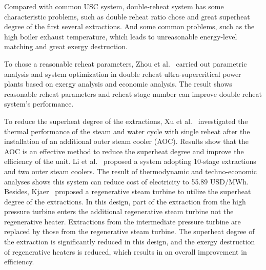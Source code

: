 \documentclass[preprint,12pt]{elsarticle}
\begin{document}
Compared with common USC system, double-reheat system has some characteristic problems, such as double reheat ratio chose and great superheat degree of the first several extractions.
And some common problems, such as the high boiler exhaust temperature, which leads to unreasonable energy-level matching and great exergy destruction. 

To chose a reasonable reheat parameters, Zhou et al.~\cite{Zhou2016Parametric} carried out parametric analysis and system optimization in double reheat ultra-supercritical power plants based on exergy analysis and economic analysis. The result shows reasonable reheat parameters and reheat stage number can improve  double reheat system's performance.


To reduce the superheat degree of the extractions, Xu et al.~\cite{Xu2015Optimum,Zhou2014A} investigated the thermal performance of the steam and water cycle with single reheat after the installation of an additional outer steam cooler (AOC).
Results show that the AOC is an effective method to reduce the superheat degree and improve the efficiency of the unit.
Li et al.~\cite{Li2014Thermodynamic} proposed a system adopting 10-stage extractions and two outer steam coolers. 
The result of thermodynamic and techno-economic analyses shows this system can reduce cost of electricity to 55.89 USD/MWh.
Besides, Kjaer~\cite{Kjaer2010A} proposed a regenerative steam turbine to utilize the superheat degree of the extractions.
In this design, part of the extraction from the high pressure turbine enters the additional regenerative steam turbine not the regenerative heater.
Extractions from the intermediate pressure turbine are replaced by those from the regenerative steam turbine.
The superheat degree of the extraction is significantly reduced in this design, and the exergy destruction of regenerative heaters is reduced, which results in an overall improvement in efficiency.
\end{document}
